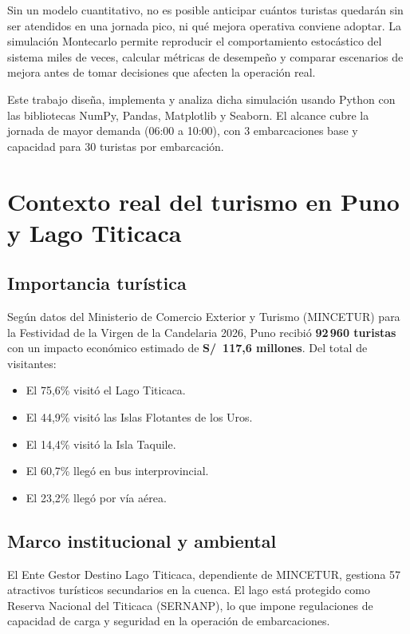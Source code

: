 \documentclass[12pt,a4paper]{article}
\begin{document}
Sin un modelo cuantitativo, no es posible anticipar cuántos turistas
quedarán sin ser atendidos en una jornada pico, ni qué mejora operativa
conviene adoptar. La simulación Montecarlo permite reproducir el
comportamiento estocástico del sistema miles de veces, calcular métricas
de desempeño y comparar escenarios de mejora antes de tomar decisiones que
afecten la operación real.

Este trabajo diseña, implementa y analiza dicha simulación usando Python con
las bibliotecas NumPy, Pandas, Matplotlib y Seaborn. El alcance cubre la
jornada de mayor demanda (06:00 a 10:00), con 3 embarcaciones base y
capacidad para 30 turistas por embarcación.

\section{Contexto real del turismo en Puno y Lago Titicaca}

\subsection{Importancia turística}

Según datos del Ministerio de Comercio Exterior y Turismo (MINCETUR) para
la Festividad de la Virgen de la Candelaria 2026, Puno recibió
\textbf{92\,960 turistas} con un impacto económico estimado de
\textbf{S/~117,6 millones}. Del total de visitantes:

\begin{itemize}[noitemsep]
  \item El 75,6\% visitó el Lago Titicaca.
  \item El 44,9\% visitó las Islas Flotantes de los Uros.
  \item El 14,4\% visitó la Isla Taquile.
  \item El 60,7\% llegó en bus interprovincial.
  \item El 23,2\% llegó por vía aérea.
\end{itemize}

\subsection{Marco institucional y ambiental}

El Ente Gestor Destino Lago Titicaca, dependiente de MINCETUR, gestiona 57
atractivos turísticos secundarios en la cuenca. El lago está protegido como
Reserva Nacional del Titicaca (SERNANP), lo que impone regulaciones de
capacidad de carga y seguridad en la operación de embarcaciones.
\end{document}
